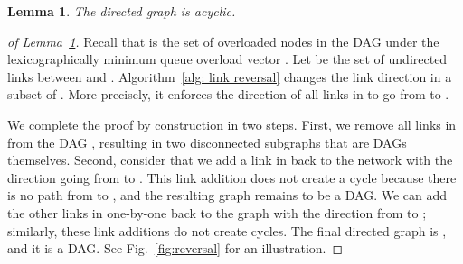 \documentclass{sig-alternate-2013}
\newtheorem{lemma}{Lemma}
\begin{document}
\begin{lemma} \label{lem: graph is dag}
The directed graph  is acyclic.
\end{lemma}
\begin{proof}[of Lemma~\ref{lem: graph is dag}]
Recall that   is the set of overloaded nodes in the DAG  under the lexicographically minimum queue overload vector . Let  be the set of undirected links between  and . Algorithm~\ref{alg: link reversal} 
changes the link direction in a subset of . More precisely, it 
enforces the direction of all links in  to go from  to .

We complete the proof by construction in two steps. First, we remove all links in  from the DAG , resulting in two disconnected subgraphs that are DAGs themselves. Second, consider that we add a link in  back to the network with the direction going from  to . This link addition does not create a cycle because there is no path from  to , and the resulting graph remains to be a DAG. We can add the other links in  one-by-one back to the graph with the direction from  to ; similarly, these link additions do not create cycles. The final directed graph is , and it is a DAG. See Fig.~\ref{fig:reversal} for an illustration.
\end{proof}
\end{document}
